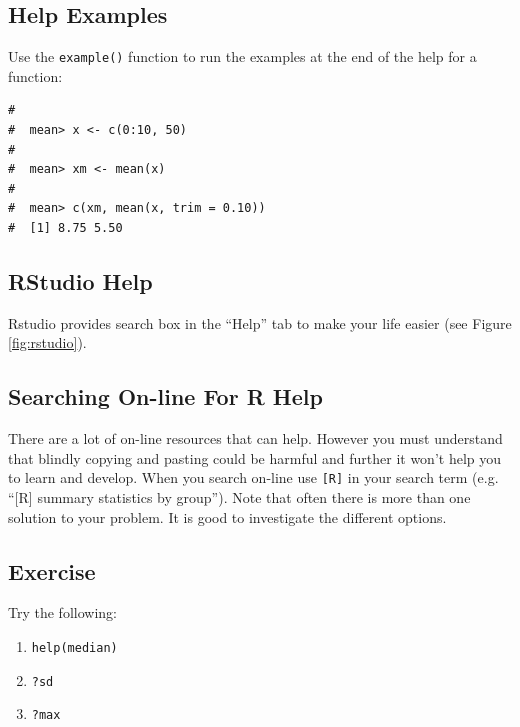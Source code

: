 \documentclass[a4paper,9pt,twocolumn,twoside,printwatermark=false]{pinp}
\providecommand{\tightlist}{%
  \setlength{\itemsep}{0pt}\setlength{\parskip}{0pt}}
\begin{document}
\subsection{Help Examples}\label{help-examples}

Use the \texttt{example()} function to run the examples at the end of
the help for a function:

\begin{Shaded}
\begin{Highlighting}[]
\end{Highlighting}
\end{Shaded}

\begin{ShadedResult}
\begin{verbatim}
#  
#  mean> x <- c(0:10, 50)
#  
#  mean> xm <- mean(x)
#  
#  mean> c(xm, mean(x, trim = 0.10))
#  [1] 8.75 5.50
\end{verbatim}
\end{ShadedResult}

\subsection{RStudio Help}\label{rstudio-help}

Rstudio provides search box in the ``Help'' tab to make your life easier
(see Figure \ref{fig:rstudio}).

\subsection{Searching On-line For R
Help}\label{searching-on-line-for-r-help}

There are a lot of on-line resources that can help. However you must
understand that blindly copying and pasting could be harmful and further
it won't help you to learn and develop. When you search on-line use
\texttt{{[}R{]}} in your search term (e.g. ``{[}R{]} summary statistics
by group''). Note that often there is more than one solution to your
problem. It is good to investigate the different options.

\subsection{Exercise}\label{exercise}

Try the following:

\begin{enumerate}
\def\labelenumi{\arabic{enumi}.}
\tightlist
\item
  \texttt{help(median)}
\item
  \texttt{?sd}
\item
  \texttt{?max}
\end{enumerate}
\end{document}
